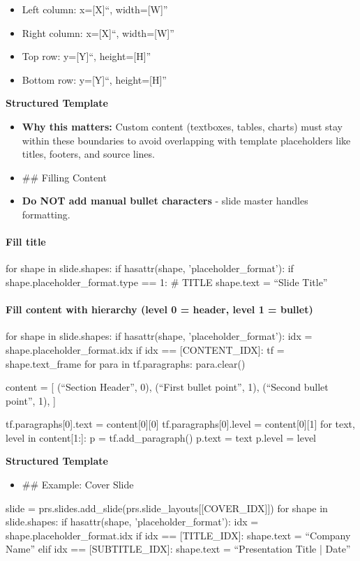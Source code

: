 \documentclass[11pt]{article}
\begin{document}
\begin{itemize}[leftmargin=*,itemsep=2pt,topsep=2pt]
\item {} Left column: x=[X]``, width=[W]''
\item {} Right column: x=[X]``, width=[W]''
\item {} Top row: y=[Y]``, height=[H]''
\item {} Bottom row: y=[Y]``, height=[H]''
\end{itemize}
\textbf{Structured Template}
\begin{itemize}[leftmargin=*,itemsep=2pt,topsep=2pt]
\item {} \textbf{Why this matters:} Custom content (textboxes, tables, charts) must stay within these boundaries to avoid overlapping with template placeholders like titles, footers, and source lines.
\item {} \#\# Filling Content
\item {} \textbf{Do NOT add manual bullet characters} - slide master handles formatting.
\end{itemize}
\paragraph{Fill title}\mbox{}\par
for shape in slide.shapes: if hasattr(shape, 'placeholder\_\allowbreak{}format'): if shape.placeholder\_\allowbreak{}format.type == 1:  \# TITLE shape.text = ``Slide Title''


\paragraph{Fill content with hierarchy (level 0 = header, level 1 = bullet)}\mbox{}\par
for shape in slide.shapes: if hasattr(shape, 'placeholder\_\allowbreak{}format'): idx = shape.placeholder\_\allowbreak{}format.idx if idx == [CONTENT\_\allowbreak{}IDX]: tf = shape.text\_\allowbreak{}frame for para in tf.paragraphs: para.clear()


content = [ (``Section Header'', 0), (``First bullet point'', 1), (``Second bullet point'', 1), ]


tf.paragraphs[0].text = content[0][0] tf.paragraphs[0].level = content[0][1] for text, level in content[1:]: p = tf.add\_\allowbreak{}paragraph() p.text = text p.level = level

\textbf{Structured Template}
\begin{itemize}[leftmargin=*,itemsep=2pt,topsep=2pt]
\item {} \#\# Example: Cover Slide
\end{itemize}
slide = prs.slides.add\_\allowbreak{}slide(prs.slide\_\allowbreak{}layouts[[COVER\_\allowbreak{}IDX]]) for shape in slide.shapes: if hasattr(shape, 'placeholder\_\allowbreak{}format'): idx = shape.placeholder\_\allowbreak{}format.idx if idx == [TITLE\_\allowbreak{}IDX]: shape.text = ``Company Name'' elif idx == [SUBTITLE\_\allowbreak{}IDX]: shape.text = ``Presentation Title | Date''
\end{document}
